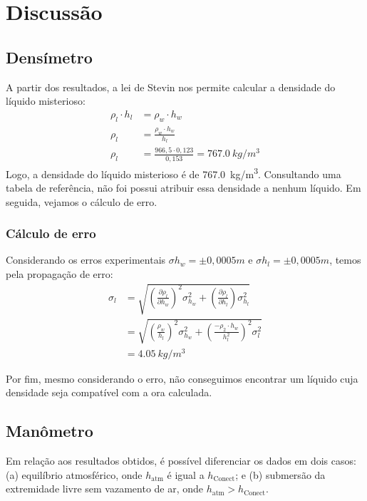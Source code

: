 \section{Discussão}
\subsection{Densímetro}

A partir dos resultados, a lei de Stevin nos permite calcular a densidade do
líquido misterioso:
\begin{align*}
    \rho_l \cdot h_l &= \rho_w \cdot h_w\\
    \rho_l &= \frac{\rho_w \cdot h_w}{h_l}\\
    \rho_l &= \frac{966,5 \cdot 0,123}{0,153} = \qty{767,0}{kg/m^3} 
\end{align*}
Logo, a densidade do líquido misterioso é de \qty{767,0}{kg/m^3}. Consultando
uma tabela de referência, não foi possui atribuir essa densidade a nenhum
líquido. Em seguida, vejamos o cálculo de erro.

\subsubsection{Cálculo de erro}
Considerando os erros experimentais \(\sigma h_w = \pm0,0005 m\) e \(\sigma h_l = \pm 0,0005 m\), temos pela propagação de erro:
\begin{align*}
    \sigma_l &= \sqrt{\left(\frac{\partial\rho_l}{\partial h_w}\right)^2\sigma_{h_w}^2 + \left(\frac{\partial\rho_l}{\partial h_l}\right)\sigma_{h_l}^2}\\
    &= \sqrt{\left(\frac{\rho_w}{h_l}\right)^2 \sigma_{h_w}^2 + \left(\frac{-\rho_2 \cdot h_w}{h_l^2}\right)^2\sigma_l^2}\\
    &= \qty{4,05}{kg/m^3}
\end{align*}

Por fim, mesmo considerando o erro, não conseguimos encontrar um líquido cuja
densidade seja compatível com a ora calculada.

\subsection{Manômetro}

Em relação aos resultados obtidos, é possível diferenciar os dados em dois
casos: (a) equilíbrio atmosférico, onde \( h_{\text{atm}} \) é igual a \(
h_{\text{Conect}} \); e (b) submersão da extremidade livre sem vazamento de ar,
onde \( h_{\text{atm}} > h_{\text{Conect}}\). 

